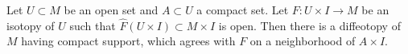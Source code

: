 Let $U \subset M$ be an open set and $A \subset U$ a compact set. Let $F: U \times I \to M$ be an isotopy of $U$ such that $\hat{F}(U \times I) \subset M \times I$ is open. Then there is a diffeotopy of $M$ having compact support, which agrees with $F$ on a neighborhood of $A \times I$.
